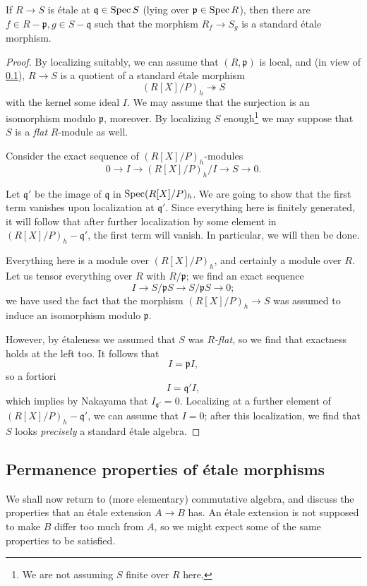 \begin{theorem} 
If $R \to S$ is \'etale at $\mathfrak{q} \in \operatorname{Spec} S$ (lying over
$\mathfrak{p} \in \operatorname{Spec} R$), then there are $f \in R-\mathfrak{p}, g \in S -
\mathfrak{q}$ such that the morphism $R_f \to S_g$ is a standard \'etale
morphism.
\end{theorem} 
\begin{proof} 
By localizing suitably, we can assume that   $(R, \mathfrak{p})$ is local,
and  (in view of \cref{}),
$R \to S$ is a quotient of a standard \'etale morphism 
\[ (R[X]/P)_h \twoheadrightarrow S  \]
with the kernel some ideal $I$. We may assume that the surjection is an
isomorphism modulo $\mathfrak{p}$, moreover.
By localizing $S$ enough\footnote{We are not assuming $S$ finite over $R$ here,}
we may suppose that $S$ is a \emph{flat} $R$-module as well.

Consider the exact sequence of $(R[X]/P)_h$-modules
\[ 0 \to I \to  (R[X]/P)_h/I \to S \to 0. \]

Let $\mathfrak{q}'$ be the image of $\mathfrak{q}$ in $\operatorname{Spec} (R[X]/P)_h$.
We are going to show that the first term vanishes upon localization at
$\mathfrak{q}'$.
Since everything here is finitely generated, 
it will follow that after further localization by some element in
$(R[X]/P)_h - \mathfrak{q}'$, the first term will vanish. In particular, we
will then be done.

Everything here is a module over $(R[X]/P)_h$, and certainly a module over
$R$. Let us tensor everything over $R$ with
$R/\mathfrak{p}$; we find an exact sequence
\[  I \to  S/\mathfrak{p}S \to S/\mathfrak{p}S \to 0 ;\]
we have used the fact that the morphism $(R[X]/P)_h \to S$ was assumed to
induce an isomorphism modulo $\mathfrak{p}$.

However, by \'etaleness we assumed that $S$ was \emph{$R$-flat}, so we find that exactness holds at the left too. 
It follows that 
\[ I  = \mathfrak{p}I,  \]
so a fortiori
\[ I = \mathfrak{q}'I,  \]
which implies by Nakayama that $I_{\mathfrak{q}'} = 0$. Localizing at a
further element of $(R[X]/P)_h - \mathfrak{q}'$, we can assume that $I=0$;
after this localization, we find that $S$ looks \emph{precisely} a standard
\'etale algebra.
\end{proof} 

\subsection{Permanence properties of \'etale morphisms}
We shall now return to (more elementary) commutative algebra, and discuss the
properties that an \'etale extension $A \to B$ has. An \'etale extension is
not supposed to make $B$ differ too much from $A$, so we might expect some of
the same properties to be satisfied.

